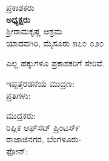 \thispagestyle{empty}

\begin{flushleft}
ಪ್ರಕಾಶಕರು\\\textbf{ಅಧ್ಯಕ್ಷರು}\\ಶ‍್ರೀರಾಮಕೃಷ್ಣ ಆಶ್ರಮ\\ಯಾದವಗಿರಿ, ಮೈಸೂರು ೫೭೦ ೦೨೦
\end{flushleft}

\vfill

\begin{flushleft}
 ಎಲ್ಲ ಹಕ್ಕುಗಳೂ ಪ್ರಕಾಶಕರಿಗೆ ಸೇರಿವೆ.
\end{flushleft}

\vfill

\begin{flushleft}
ಇಪ್ಪತ್ತೆರಡನೆಯ ಮುದ್ರಣ: \\ಪ್ರತಿಗಳು: 
\end{flushleft}

\vfill

\begin{flushleft}
ಮುದ್ರಕರು:\\ರಿಪ್ಲಿಕ ಆಫ್‌ಸೆಟ್ ಪ್ರಿಂಟರ್ಸ್\\ರಾಜಾಜಿನಗರ, ಬೆಂಗಳೂರು-\\ಫೋನ್: 
\end{flushleft}

